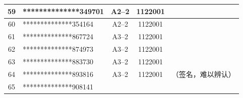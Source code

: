 \documentclass[UTF8,10pt,a4paper,fontset=fandol]{ctexart}
\newcommand{\fieldvalue}[1]{#1}
\newcommand{\handwritten}[1]{#1}
\begin{document}
\begin{center}
\begin{tabular}{|c|p{4.2cm}|c|c|p{2.0cm}|}
\fieldvalue{59} &
\fieldvalue{**************349701} &
\fieldvalue{A2--2} &
\fieldvalue{1122001} & \\ \hline
\fieldvalue{60} &
\fieldvalue{**************354164} &
\fieldvalue{A2--2} &
\fieldvalue{1122001} & \\ \hline
\fieldvalue{61} &
\fieldvalue{**************867724} &
\fieldvalue{A3--2} &
\fieldvalue{1122001} & \\ \hline
\fieldvalue{62} &
\fieldvalue{**************874973} &
\fieldvalue{A3--2} &
\fieldvalue{1122001} & \\ \hline
\fieldvalue{63} &
\fieldvalue{**************883730} &
\fieldvalue{A3--2} &
\fieldvalue{1122001} & \\ \hline
\fieldvalue{64} &
\fieldvalue{**************893816} &
\fieldvalue{A3--2} &
\fieldvalue{1122001} &
\fieldvalue{\handwritten{（签名，难以辨认）}}
\\ \hline
\fieldvalue{65} &
\fieldvalue{**************908141} &

\end{tabular}
\end{center}
\end{document}
